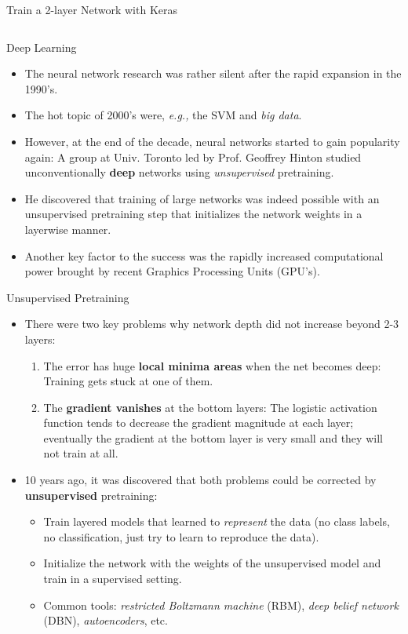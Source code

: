 \documentclass[10pt, aspectratio=169]{beamer} %
\begin{document}
\begin{frame}[fragile]{Train a 2-layer Network with Keras}
\begin{columns}
\end{columns}
\end{frame}

\begin{frame}{Deep Learning}
	\begin{itemize}
		\item The neural network research was rather silent after the rapid expansion in the 1990's.
		\item The hot topic of 2000's were, \emph{e.g.,} the SVM and \emph{big data}.
		\item However, at the end of the decade, neural networks started to gain popularity again:
		A group at Univ. Toronto led by Prof. Geoffrey Hinton studied unconventionally \textbf{deep} networks
		using \emph{unsupervised} pretraining.
		\item He discovered that training of large networks was indeed possible with 
		an unsupervised pretraining step that initializes the network weights in a layerwise manner.
		\item Another key factor to the success was the rapidly increased computational power brought 
		by recent Graphics Processing Units (GPU's).
		\end{itemize}
\end{frame}

\begin{frame}{Unsupervised Pretraining}
	\begin{itemize}
		\item There were two key problems why network depth did not increase beyond 2-3 layers:
		\begin{enumerate}
			\item The error has huge \textbf{local minima areas} when the net becomes deep: Training gets stuck at one of them.
			\item The \textbf{gradient vanishes} at the bottom layers: The logistic activation function tends to decrease the gradient magnitude at each layer; eventually the gradient at the bottom layer is very small and they will not train at all.
		\end{enumerate}
		\item 10 years ago, it was discovered that both problems could be corrected by \textbf{unsupervised} pretraining:
		\begin{itemize}
			\item Train layered models that learned to \emph{represent} the data (no class labels, no classification, just
		try to learn to reproduce the data).
		\item Initialize the network with the weights of the unsupervised model and train in a supervised setting.
		\item Common tools: \emph{restricted Boltzmann machine} (RBM), \emph{deep belief network} (DBN), 
		\emph{autoencoders}, etc.
		\end{itemize}
		\end{itemize}
\end{frame}
\end{document}
